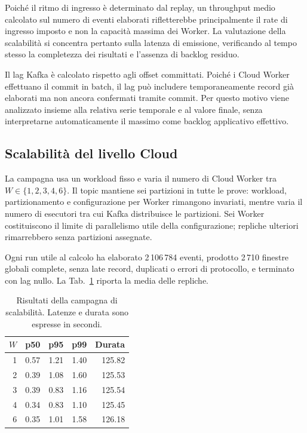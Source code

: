 Poiché il ritmo di ingresso è determinato dal replay, un throughput medio
calcolato sul numero di eventi elaborati rifletterebbe principalmente il rate
di ingresso imposto e non la capacità massima dei Worker. La valutazione della
scalabilità si concentra pertanto sulla latenza di emissione, verificando al
tempo stesso la completezza dei risultati e l'assenza di backlog residuo.

Il lag Kafka è calcolato rispetto agli offset committati. Poiché i Cloud
Worker effettuano il commit in batch, il lag può includere temporaneamente
record già elaborati ma non ancora confermati tramite commit. Per questo
motivo viene analizzato insieme alla relativa serie temporale e al valore
finale, senza interpretarne automaticamente il massimo come backlog
applicativo effettivo.

\subsection{Scalabilità del livello Cloud}

La campagna usa un workload fisso e varia il numero di Cloud Worker tra
$W\in\{1,2,3,4,6\}$. Il topic mantiene sei partizioni in tutte le prove:
workload, partizionamento e configurazione per Worker rimangono invariati,
mentre varia il numero di esecutori tra cui Kafka distribuisce le partizioni.
Sei Worker costituiscono il limite di parallelismo utile della configurazione;
repliche ulteriori rimarrebbero senza partizioni assegnate.

Ogni run utile al calcolo ha
elaborato 2\,106\,784 eventi, prodotto 2\,710 finestre globali complete, senza
late record, duplicati o errori di protocollo, e terminato con lag nullo. La
Tab.~\ref{tab:scaling-results} riporta la media delle repliche.

\begin{table}[H]
    \caption{Risultati della campagna di scalabilità. Latenze e durata sono
    espresse in secondi.}
    \label{tab:scaling-results}
    \centering
    \begin{tabular}{@{}rrrrr@{}}
        \toprule
        $W$ & p50 & p95 & p99 & Durata \\
        \midrule
        1 & 0.57 & 1.21 & 1.40 & 125.82 \\
        2 & 0.39 & 1.08 & 1.60 & 125.53 \\
        3 & 0.39 & 0.83 & 1.16 & 125.54 \\
        4 & 0.34 & 0.83 & 1.10 & 125.45 \\
        6 & 0.35 & 1.01 & 1.58 & 126.18 \\
        \bottomrule
    \end{tabular}
\end{table}

